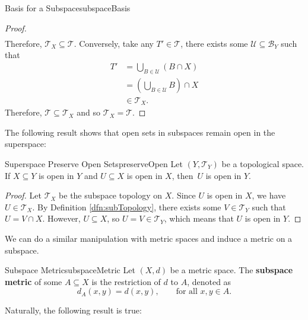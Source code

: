 \documentclass[math, code]{amznotes}
\theoremstyle{remark}
\begin{document}
\begin{probox}{Basis for a Subspace}{subspaceBasis}
\begin{proof}
\begin{align*}
        \end{align*}
        Therefore, $\mathcal{T}_X \subseteq \mathcal{T}$. Conversely, take any $T' \in \mathcal{T}$, there exists some $\mathcal{U} \subseteq \mathcal{B}_Y$ such that
        \begin{align*}
            T' & = \bigcup_{B \in \mathcal{U}}\left(B \cap X\right) \\
            & = \left(\bigcup_{B \in \mathcal{U}}B\right) \cap X \\
            & \in \mathcal{T}_X.
        \end{align*}
        Therefore, $\mathcal{T} \subseteq \mathcal{T}_X$ and so $\mathcal{T}_X = \mathcal{T}$.
    \end{proof}
\end{probox}
The following result shows that open sets in subspaces remain open in the superspace:
\begin{probox}{Superspace Preserve Open Sets}{preserveOpen}
    Let $\left(Y, \mathcal{T}_Y\right)$ be a topological space. If $X \subseteq Y$ is open in $Y$ and $U \subseteq X$ is open in $X$, then~$U$ is open in $Y$.
    \tcblower
    \begin{proof}
        Let $\mathcal{T}_X$ be the subspace topology on $X$. Since $U$ is open in $X$, we have $U \in \mathcal{T}_X$. By Definition \ref{dfn:subTopology}, there exists some $V \in \mathcal{T}_Y$ such that $U = V \cap X$. However, $U \subseteq X$, so $U = V \in \mathcal{T}_Y$, which means that $U$ is open in $Y$.
    \end{proof}
\end{probox}
We can do a similar manipulation with metric spaces and induce a metric on a subspace.
\begin{dfnbox}{Subspace Metric}{subspaceMetric}
    Let $\left(X, d\right)$ be a metric space. The {\color{red} \textbf{subspace metric}} of some $A \subseteq X$ is the restriction of $d$ to $A$, denoted as 
    \begin{equation*}
        d_A\left(x, y\right) = d\left(x, y\right), \qquad \textrm{for all } x, y \in A.
    \end{equation*}
\end{dfnbox}
Naturally, the following result is true:
\end{document}
